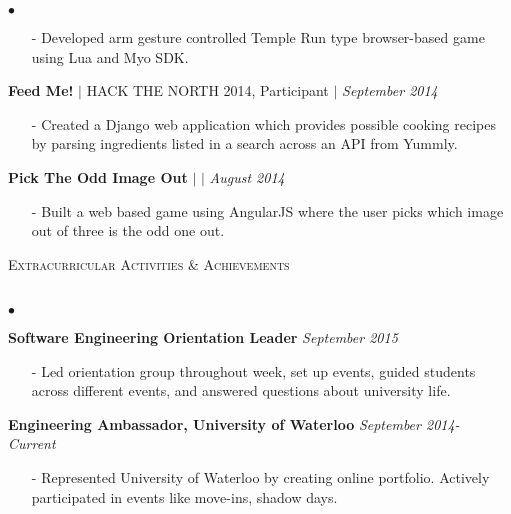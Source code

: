 \documentclass[10pt]{article}
\newcommand{\lineunder}{\vspace*{-8pt} \\ \hspace*{-18pt} \hrulefill \\}
\newcommand{\header}[1]{{\hspace*{-15pt}\vspace*{6pt} \textsc{#1}} \vspace*{-6pt} \lineunder }
\newenvironment{achievements}{\begin{list}{$\bullet$}{\topsep 0pt \itemsep -1.5pt \leftmargin 5pt}}{\vspace*{4pt}\end{list}}
\begin{document}
\begin{achievements}
\begin{itemize}
\item[-]Developed arm gesture controlled Temple Run type browser-based game using Lua and Myo SDK.
\end{itemize}
\vspace{2pt}
\item \textbf{Feed Me!} {$|$ \scriptsize HACK THE NORTH 2014, Participant}   $|$  \href{https://github.com/nakulpathak3/FeedMe}{\faGithub} \hfill \textit {September 2014}
\begin{itemize}
\item[-]Created a Django web application which provides possible cooking recipes by parsing ingredients listed in a search across an API from Yummly.
\end{itemize}
\item \textbf{Pick The Odd Image Out} $|$  \href{https://github.com/nakulpathak3/pick-odd-image-out}{\faGithub} $|$ \href{http://picktheoddimageout.bitballoon.com}{\faExternalLink}  \hfill \textit {August 2014}
\begin{itemize}
\item[-] Built a web based game using AngularJS where the user picks which image out of three is the odd one out. 
\end{itemize}
\end{achievements}

\vspace{8pt}

\header{\fontsize{11}{12}\selectfont Extracurricular Activities \& Achievements}
\begin{achievements}
\item \textbf{Software Engineering Orientation Leader} \hfill \textit {September 2015}
\begin{itemize}
\item[-] Led orientation group throughout week, set up events, guided students across different events, and answered questions about university life.
\end{itemize}
\vspace{2pt}
\item \textbf{Engineering Ambassador, University of Waterloo} \hfill \textit {September 2014- Current}
\begin{itemize}
\item[-] Represented University of Waterloo by creating online portfolio. Actively participated in events like move-ins, shadow days.
\end{itemize}
\end{achievements}
\end{document}
